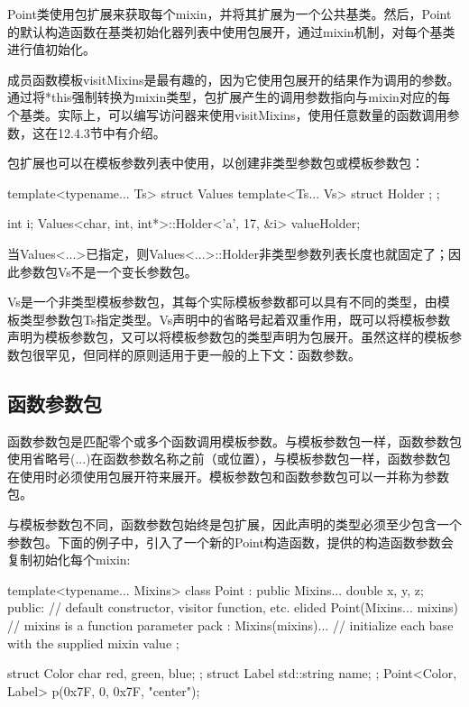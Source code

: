 Point类使用包扩展来获取每个mixin，并将其扩展为一个公共基类。然后，Point的默认构造函数在基类初始化器列表中使用包展开，通过mixin机制，对每个基类进行值初始化。

成员函数模板visitMixins是最有趣的，因为它使用包展开的结果作为调用的参数。通过将*this强制转换为mixin类型，包扩展产生的调用参数指向与mixin对应的每个基类。实际上，可以编写访问器来使用visitMixins，使用任意数量的函数调用参数，这在12.4.3节中有介绍。

包扩展也可以在模板参数列表中使用，以创建非类型参数包或模板参数包：

\begin{cpp}
template<typename... Ts>
struct Values {
	template<Ts... Vs>
	struct Holder {
	};
};

int i;
Values<char, int, int*>::Holder<'a', 17, &i> valueHolder;
\end{cpp}

当Values<...>已指定，则Values<...>::Holder非类型参数列表长度也就固定了；因此参数包Vs不是一个变长参数包。

Vs是一个非类型模板参数包，其每个实际模板参数都可以具有不同的类型，由模板类型参数包Ts指定类型。Vs声明中的省略号起着双重作用，既可以将模板参数声明为模板参数包，又可以将模板参数包的类型声明为包展开。虽然这样的模板参数包很罕见，但同样的原则适用于更一般的上下文：函数参数。

\subsection{函数参数包}

函数参数包是匹配零个或多个函数调用模板参数。与模板参数包一样，函数参数包使用省略号(...)在函数参数名称之前（或位置），与模板参数包一样，函数参数包在使用时必须使用包展开符来展开。模板参数包和函数参数包可以一并称为参数包。

与模板参数包不同，函数参数包始终是包扩展，因此声明的类型必须至少包含一个参数包。下面的例子中，引入了一个新的Point构造函数，提供的构造函数参数会复制初始化每个mixin:

\begin{cpp}
template<typename... Mixins>
class Point : public Mixins... {
	double x, y, z;
public:
	// default constructor, visitor function, etc. elided
	Point(Mixins... mixins) // mixins is a function parameter pack
		: Mixins(mixins)... { } // initialize each base with the supplied mixin value
};

struct Color { char red, green, blue; };
struct Label { std::string name; };
Point<Color, Label> p({0x7F, 0, 0x7F}, {"center"});
\end{cpp}

